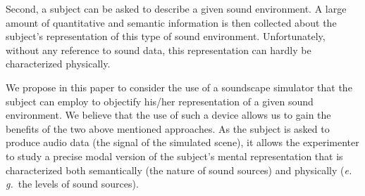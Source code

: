 \documentclass[12pt]{elsarticle}
\newcommand{\ie}{\emph{i.\,e.}}
\newcommand{\eg}{\emph{e.\,g.}}
\providecommand{\DIFadd}[1]{{\protect\color{blue}\uwave{#1}}} %
\providecommand{\DIFaddbegin}{} %
\providecommand{\DIFaddend}{} %
\begin{document}

Second, a subject can be asked to describe a given sound environment\DIFaddbegin \DIFadd{, see~}\DIFaddend \cite{guastavino2006ideal, dubois2006cognitive}. A large amount of quantitative and semantic information is then collected about the subject's representation of this type of sound environment. Unfortunately, without any reference to sound data, this representation can hardly be characterized physically.


We propose in this paper to consider the use of a soundscape simulator that the subject can employ to objectify his/her representation of a given sound environment. We believe that the use of such a device allows us to gain the benefits of the two above mentioned approaches. As the subject is asked to produce audio data (the signal of the simulated scene), it allows the experimenter to study a precise modal version of the subject's mental representation that is characterized both semantically (the nature of sound sources) and physically (\eg~the levels of sound sources).

\end{document}
